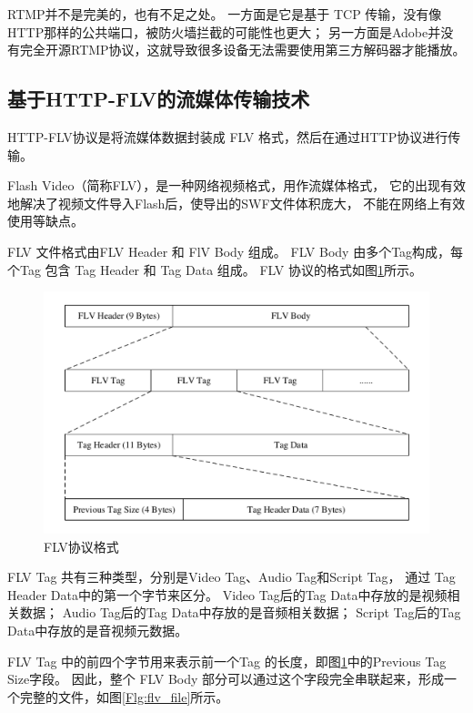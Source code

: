 RTMP并不是完美的，也有不足之处。
一方面是它是基于 TCP 传输，没有像HTTP那样的公共端口，被防火墙拦截的可能性也更大；
另一方面是Adobe并没有完全开源RTMP协议，这就导致很多设备无法需要使用第三方解码器才能播放。

\newpage
\subsection{基于HTTP-FLV的流媒体传输技术}
HTTP-FLV协议是将流媒体数据封装成 FLV 格式，然后在通过HTTP协议进行传输。

Flash Video（简称FLV），是一种网络视频格式，用作流媒体格式，
它的出现有效地解决了视频文件导入Flash后，使导出的SWF文件体积庞大，
不能在网络上有效使用等缺点。\cite{WIKI_FLV}

FLV 文件格式由FLV Header 和 FlV Body 组成。
FLV Body 由多个Tag构成，每个Tag 包含 Tag Header 和 Tag Data 组成。
FLV 协议的格式如图\ref{Fig:flv}所示。

\begin{figure}[ht]
    \centering
    \includegraphics[scale=.8]{./Figure/IMG_flv.pdf}
    \caption{FLV协议格式}
    \label{Fig:flv}
\end{figure}

FLV Tag 共有三种类型，分别是Video Tag、Audio Tag和Script Tag，
通过 Tag Header Data中的第一个字节来区分。
Video Tag后的Tag Data中存放的是视频相关数据；
Audio Tag后的Tag Data中存放的是音频相关数据；
Script Tag后的Tag Data中存放的是音视频元数据。

FLV Tag 中的前四个字节用来表示前一个Tag 的长度，即图\ref{Fig:flv}中的Previous Tag Size字段。
因此，整个 FLV Body 部分可以通过这个字段完全串联起来，形成一个完整的文件，如图\ref{Flg:flv_file}所示。

